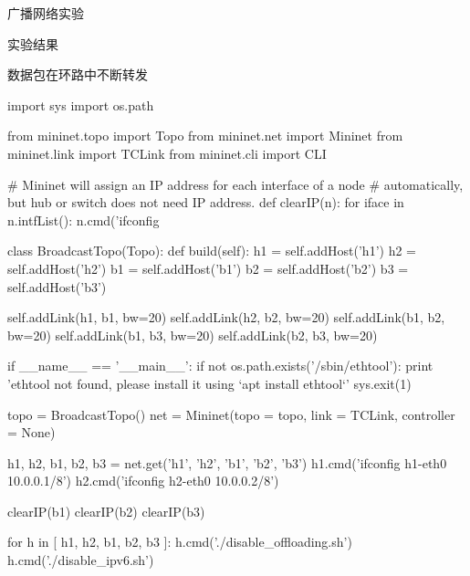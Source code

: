 \documentclass{article} %
\begin{document}
\begin{section}{广播网络实验}
\begin{subsection}{实验结果}
\begin{subsubsection}{数据包在环路中不断转发}
\begin{python}
import sys
import os.path

from mininet.topo import Topo
from mininet.net import Mininet
from mininet.link import TCLink
from mininet.cli import CLI

# Mininet will assign an IP address for each interface of a node 
# automatically, but hub or switch does not need IP address.
def clearIP(n):
for iface in n.intfList():
n.cmd('ifconfig %

class BroadcastTopo(Topo):
def build(self):
h1 = self.addHost('h1')
h2 = self.addHost('h2')
b1 = self.addHost('b1')
b2 = self.addHost('b2')
b3 = self.addHost('b3')

self.addLink(h1, b1, bw=20)
self.addLink(h2, b2, bw=20)
self.addLink(b1, b2, bw=20)
self.addLink(b1, b3, bw=20)
self.addLink(b2, b3, bw=20)

if __name__ == '__main__':
if not os.path.exists('/sbin/ethtool'):
print 'ethtool not found, please install it using `apt install ethtool`'
sys.exit(1)

topo = BroadcastTopo()
net = Mininet(topo = topo, link = TCLink, controller = None) 

h1, h2, b1, b2, b3 = net.get('h1', 'h2', 'b1', 'b2', 'b3')
h1.cmd('ifconfig h1-eth0 10.0.0.1/8')
h2.cmd('ifconfig h2-eth0 10.0.0.2/8')

clearIP(b1)
clearIP(b2)
clearIP(b3)

for h in [ h1, h2, b1, b2, b3 ]:
h.cmd('./disable_offloading.sh')
h.cmd('./disable_ipv6.sh')


\end{python}
\end{subsubsection}
\end{subsection}
\end{section}
\end{document}

